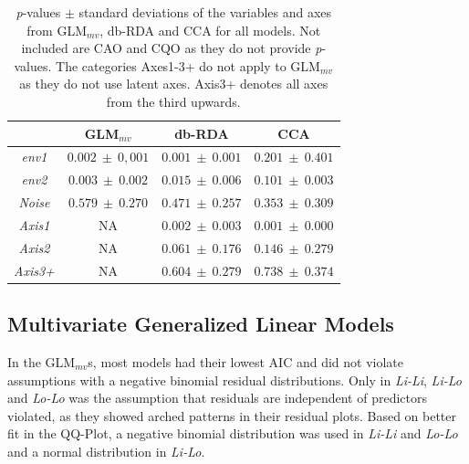 		
		\begin{table}[h!]
			\centering
			\caption{\textit{p}-values $\pm$ standard deviations of the variables and axes from GLM$_{mv}$, db-RDA and CCA for all models. Not included are CAO and CQO as they do not provide \textit{p}-values. The categories Axes1-3+ do not apply to GLM$_{mv}$ as they do not use latent axes. Axis3+ denotes all axes from the third upwards. }	
				\begin{tabular}{@{}cccc@{}}
					\toprule
								   & \textbf{GLM$_{mv}$}               & \textbf{db-RDA}		    & \textbf{CCA} \\
					\hline
					\textit{env1}  & \small $0.002\ \pm\ 0,001$ & \small $0.001\ \pm\ 0.001$ & \small $0.201\ \pm\ 0.401$ \\
					\textit{env2}  & \small $0.003\ \pm\ 0.002$ & \small $0.015\ \pm\ 0.006$ & \small $0.101\ \pm\ 0.003$ \\
					\textit{Noise} & \small $0.579\ \pm\ 0.270$ & \small $0.471\ \pm\ 0.257$ & \small $0.353\ \pm\ 0.309$ \\
					\textit{Axis1} & 			NA				& \small $0.002\ \pm\ 0.003$ &	\small $0.001\ \pm\ 0.000$ \\	
					\textit{Axis2} & 			NA				& \small $0.061\ \pm\ 0.176$ &  \small $0.146\ \pm\ 0.279$ \\
					\textit{Axis3+}&			NA				& \small $0.604\ \pm\ 0.279$ & \small  $0.738\ \pm\ 0.374$ \\
					\bottomrule
				\end{tabular}
				
				\label{table:results1}	
		\end{table}

	
	\subsection{Multivariate Generalized Linear Models}
	
		In the GLM$_{mv}$s, most models had their lowest AIC and did not violate assumptions with a negative binomial residual distributions.
		Only in \textit{Li-Li}, \textit{Li-Lo} and \textit{Lo-Lo} was the assumption that residuals are independent of predictors violated, as they showed arched patterns in their residual plots.  
		Based on better fit in the QQ-Plot, a negative binomial distribution was used in \textit{Li-Li} and \textit{Lo-Lo} and a normal distribution in \textit{Li-Lo}.
		
